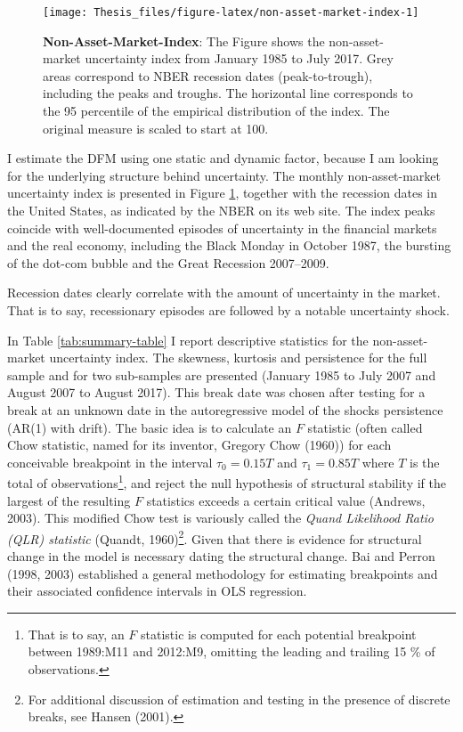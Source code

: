 \documentclass[12pt,twoside]{reedthesis}
\begin{document}
\begin{figure}

{\centering \texttt{[image: Thesis\_files/figure-latex/non-asset-market-index-1]} 

}

\caption[Non-Asset-Market-Index]{\textbf{Non-Asset-Market-Index}: The Figure shows the non-asset-market uncertainty index from January 1985 to July 2017. Grey areas correspond to NBER recession dates (peak-to-trough), including the peaks and troughs. The horizontal line corresponds to the 95 percentile of the empirical distribution of the index. The original measure is scaled to start at 100.}\label{fig:non-asset-market-index}
\end{figure}
I estimate the DFM using one static and dynamic factor, because I am looking for the underlying structure behind uncertainty. The monthly non-asset-market uncertainty index is presented in Figure \ref{fig:non-asset-market-index}, together with the recession dates in the United States, as indicated by the NBER on its web site. The index peaks coincide with well-documented episodes of uncertainty in the financial markets and the real economy, including the Black Monday in October 1987, the bursting of the dot-com bubble and the Great Recession 2007--2009.

Recession dates clearly correlate with the amount of uncertainty in the market. That is to say, recessionary episodes are followed by a notable uncertainty shock.

In Table \ref{tab:summary-table} I report descriptive statistics for the non-asset-market uncertainty index. The skewness, kurtosis and persistence for the full sample and for two sub-samples are presented (January 1985 to July 2007 and August 2007 to August 2017). This break date was chosen after testing for a break at an unknown date in the autoregressive model of the shocks persistence (AR(1) with drift). The basic idea is to calculate an \(F\) statistic (often called Chow statistic, named for its inventor, Gregory Chow (1960)) for each conceivable breakpoint in the interval \(\tau_{0} = 0.15T\) and \(\tau_{1} = 0.85T\) where \(T\) is the total of observations\footnote{That is to say, an \(F\) statistic is computed for each potential breakpoint between 1989:M11 and 2012:M9, omitting the leading and trailing 15 \% of observations.}, and reject the null hypothesis of structural stability if the largest of the resulting \(F\) statistics exceeds a certain critical value (Andrews, 2003). This modified Chow test is variously called the \emph{Quand Likelihood Ratio (QLR) statistic} (Quandt, 1960)\footnote{For additional discussion of estimation and testing in the presence of discrete breaks, see Hansen (2001).}. Given that there is evidence for structural change in the model is necessary dating the structural change. Bai and Perron (1998, 2003) established a general methodology for estimating breakpoints and their associated confidence intervals in OLS regression.
\end{document}
